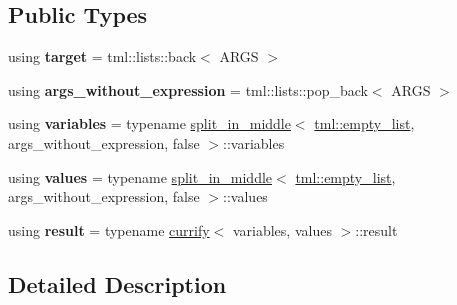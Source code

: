 \subsection*{Public Types}
\begin{DoxyCompactItemize}
\item 
\hypertarget{structtml_1_1impl_1_1multi__let__currifier_ab422a7d96048a577cc246d0be421db36}{using {\bfseries target} = tml\+::lists\+::back$<$ A\+R\+G\+S $>$}\label{structtml_1_1impl_1_1multi__let__currifier_ab422a7d96048a577cc246d0be421db36}

\item 
\hypertarget{structtml_1_1impl_1_1multi__let__currifier_ae30bf2ee476c981d43bc0187bf42b357}{using {\bfseries args\+\_\+without\+\_\+expression} = tml\+::lists\+::pop\+\_\+back$<$ A\+R\+G\+S $>$}\label{structtml_1_1impl_1_1multi__let__currifier_ae30bf2ee476c981d43bc0187bf42b357}

\item 
\hypertarget{structtml_1_1impl_1_1multi__let__currifier_ad331ebe4d1265c453e0da97605e19d27}{using {\bfseries variables} = typename \hyperlink{structtml_1_1impl_1_1multi__let__currifier_1_1split__in__middle}{split\+\_\+in\+\_\+middle}$<$ \hyperlink{structtml_1_1list}{tml\+::empty\+\_\+list}, args\+\_\+without\+\_\+expression, false $>$\+::variables}\label{structtml_1_1impl_1_1multi__let__currifier_ad331ebe4d1265c453e0da97605e19d27}

\item 
\hypertarget{structtml_1_1impl_1_1multi__let__currifier_a704710d5d8e1d144821bb56b2025eab8}{using {\bfseries values} = typename \hyperlink{structtml_1_1impl_1_1multi__let__currifier_1_1split__in__middle}{split\+\_\+in\+\_\+middle}$<$ \hyperlink{structtml_1_1list}{tml\+::empty\+\_\+list}, args\+\_\+without\+\_\+expression, false $>$\+::values}\label{structtml_1_1impl_1_1multi__let__currifier_a704710d5d8e1d144821bb56b2025eab8}

\item 
\hypertarget{structtml_1_1impl_1_1multi__let__currifier_aea293d4760e8c0d547d2459c9148dc98}{using {\bfseries result} = typename \hyperlink{structtml_1_1impl_1_1multi__let__currifier_1_1currify}{currify}$<$ variables, values $>$\+::result}\label{structtml_1_1impl_1_1multi__let__currifier_aea293d4760e8c0d547d2459c9148dc98}

\end{DoxyCompactItemize}


\subsection{Detailed Description}
